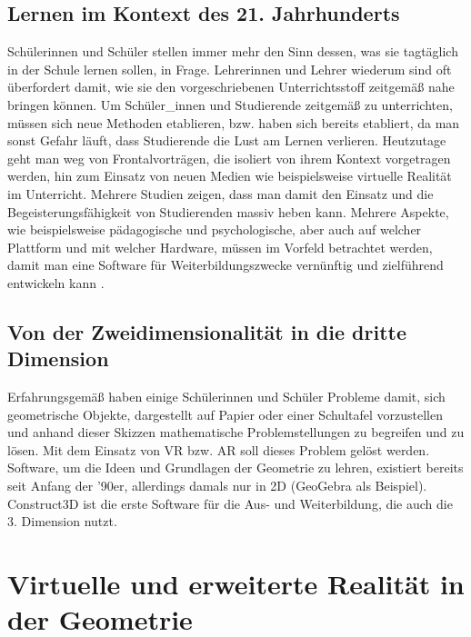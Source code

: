 \documentclass[deutsch]{llncs}
\begin{document}
\subsection{Lernen im Kontext des 21. Jahrhunderts}
Schülerinnen und Schüler stellen immer mehr den Sinn dessen, was sie tagtäglich in der Schule lernen sollen, in Frage. Lehrerinnen und Lehrer wiederum sind oft überfordert damit, wie sie den vorgeschriebenen Unterrichtsstoff zeitgemäß nahe bringen können. Um Schüler\_innen und Studierende zeitgemäß zu unterrichten, müssen sich neue Methoden etablieren, bzw. haben sich bereits etabliert, da man sonst Gefahr läuft, dass Studierende die Lust am Lernen verlieren. Heutzutage geht man weg von Frontalvorträgen, die isoliert von ihrem Kontext vorgetragen werden, hin zum Einsatz von neuen Medien wie beispielsweise virtuelle Realität im Unterricht. Mehrere Studien \cite{Hu-Au} zeigen, dass man damit den Einsatz und die Begeisterungsfähigkeit von Studierenden massiv heben kann.
Mehrere Aspekte, wie beispielsweise pädagogische und psychologische, aber auch auf welcher Plattform und mit welcher Hardware, müssen im Vorfeld betrachtet werden, damit man eine Software für Weiterbildungszwecke vernünftig und zielführend entwickeln kann \cite{article}.
\subsection{Von der Zweidimensionalität in die dritte Dimension}
Erfahrungsgemäß haben einige Schülerinnen und Schüler Probleme damit, sich geometrische Objekte, dargestellt auf Papier oder einer Schultafel vorzustellen und anhand dieser Skizzen mathematische Problemstellungen zu begreifen und zu lösen. Mit dem Einsatz von VR bzw. AR soll dieses Problem gelöst werden.\\
Software, um die Ideen und Grundlagen der Geometrie zu lehren, existiert bereits seit Anfang der '90er, allerdings damals nur in 2D (GeoGebra als Beispiel). \\
Construct3D ist die erste Software für die Aus- und Weiterbildung, die auch die 3. Dimension nutzt. %
\section{Virtuelle und erweiterte Realität in der Geometrie}
\end{document}
